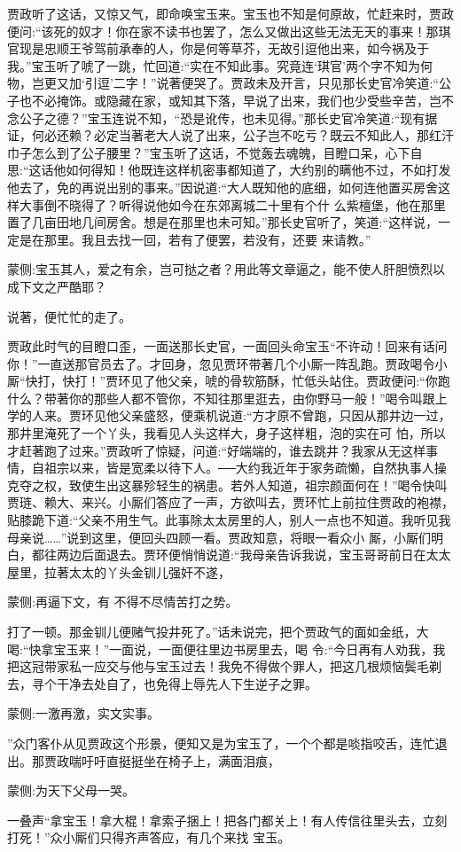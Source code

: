 \begin{parag}
    贾政听了这话，又惊又气，即命唤宝玉来。宝玉也不知是何原故，忙赶来时，贾政便问:“该死的奴才！你在家不读书也罢了，怎么又做出这些无法无天的事来！那琪官现是忠顺王爷驾前承奉的人，你是何等草芥，无故引逗他出来，如今祸及于我。”宝玉听了唬了一跳，忙回道:“实在不知此事。究竟连‘琪官’两个字不知为何物，岂更又加‘引逗’二字！”说著便哭了。贾政未及开言，只见那长史官冷笑道:“公子也不必掩饰。或隐藏在家，或知其下落，早说了出来，我们也少受些辛苦，岂不念公子之德？”宝玉连说不知，“恐是讹传，也未见得。”那长史官冷笑道:“现有据证，何必还赖？必定当著老大人说了出来，公子岂不吃亏？既云不知此人，那红汗巾子怎么到了公子腰里？”宝玉听了这话，不觉轰去魂魄，目瞪口呆，心下自思:“这话他如何得知！他既连这样机密事都知道了，大约别的瞒他不过，不如打发他去了，免的再说出别的事来。”因说道:“大人既知他的底细，如何连他置买房舍这样大事倒不晓得了？听得说他如今在东郊离城二十里有个什 么紫檀堡，他在那里置了几亩田地几间房舍。想是在那里也未可知。”那长史官听了，笑道:“这样说，一定是在那里。我且去找一回，若有了便罢，若没有，还要 来请教。”\begin{note}蒙侧:宝玉其人，爱之有余，岂可挞之者？用此等文章逼之，能不使人肝胆愤烈以成下文之严酷耶？\end{note}说著，便忙忙的走了。
\end{parag}


\begin{parag}
    贾政此时气的目瞪口歪，一面送那长史官，一面回头命宝玉“不许动！回来有话问你！”一直送那官员去了。才回身，忽见贾环带著几个小厮一阵乱跑。贾政喝令小厮“快打，快打！”贾环见了他父亲，唬的骨软筋酥，忙低头站住。贾政便问:“你跑什么？带著你的那些人都不管你，不知往那里逛去，由你野马一般！”喝令叫跟上学的人来。贾环见他父亲盛怒，便乘机说道:“方才原不曾跑，只因从那井边一过，那井里淹死了一个丫头，我看见人头这样大，身子这样粗，泡的实在可 怕，所以才赶著跑了过来。”贾政听了惊疑，问道:“好端端的，谁去跳井？我家从无这样事情，自祖宗以来，皆是宽柔以待下人。──大约我近年于家务疏懒，自然执事人操克夺之权，致使生出这暴殄轻生的祸患。若外人知道，祖宗颜面何在！”喝令快叫贾琏、赖大、来兴。小厮们答应了一声，方欲叫去，贾环忙上前拉住贾政的袍襟，贴膝跪下道:“父亲不用生气。此事除太太房里的人，别人一点也不知道。我听见我母亲说……”说到这里，便回头四顾一看。贾政知意，将眼一看众小 厮，小厮们明白，都往两边后面退去。贾环便悄悄说道:“我母亲告诉我说，宝玉哥哥前日在太太屋里，拉著太太的丫头金钏儿强奸不遂，\begin{note}蒙侧:再逼下文，有 不得不尽情苦打之势。\end{note}打了一顿。那金钏儿便赌气投井死了。”话未说完，把个贾政气的面如金纸，大喝:“快拿宝玉来！”一面说，一面便往里边书房里去，喝 令:“今日再有人劝我，我把这冠带家私一应交与他与宝玉过去！我免不得做个罪人，把这几根烦恼鬓毛剃去，寻个干净去处自了，也免得上辱先人下生逆子之罪。\begin{note}蒙侧:一激再激，实文实事。\end{note}”众门客仆从见贾政这个形景，便知又是为宝玉了，一个个都是啖指咬舌，连忙退出。那贾政喘吁吁直挺挺坐在椅子上，满面泪痕，\begin{note}蒙侧:为天下父母一哭。\end{note}一叠声“拿宝玉！拿大棍！拿索子捆上！把各门都关上！有人传信往里头去，立刻打死！”众小厮们只得齐声答应，有几个来找 宝玉。
\end{parag}


